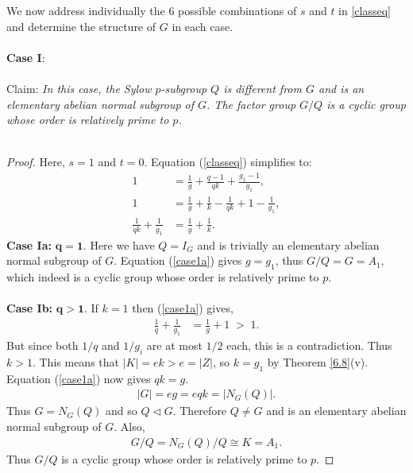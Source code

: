 We now address individually the 6 possible combinations of $s$ and $t$ in \eqref{classeq} and determine the structure of $G$ in each case. \\
\\
\textbf{Case I}:\\
\\
Claim: \textit{In this case, the Sylow $p$-subgroup $Q$ is different from $G$ and is an elementary abelian normal subgroup of $G$. The factor group $G/Q$ is a cyclic group whose order is relatively prime to $p$.} \\
\\
\begin{proof} Here, $s = 1$ and $t = 0$. Equation (\ref{classeq}) simplifies to:
\begin{align}\label{case1a} 1 &= \frac{1}{g} + \frac{q-1}{qk} + \frac{g_1-1}{g_1}, \nonumber
\\ 1 &= \frac{1}{g} + \frac{1}{k} - \frac{1}{qk}  + 1 - \frac{1}{g_1}, \nonumber
\\ \frac{1}{qk}  + \frac{1}{g_1} &= \frac{1}{g} + \frac{1}{k}.
\end{align}
 \space \textbf{Case Ia:} $\pmb{q = 1}$. Here we have $Q = I_G$ and is trivially an elementary abelian normal subgroup of $G$. Equation (\ref{case1a}) gives $g=g_1$, thus $G/Q = G = A_1$, which indeed is a cyclic group whose order is relatively prime to $p$. \\
\\
 \space \textbf{Case Ib:} $\pmb{q > 1}$. If $k=1$ then (\ref{case1a}) gives,
\begin{align*} \frac{1}{q}  + \frac{1}{g_1} &= \frac{1}{g} + 1 \; > \; 1.
\end{align*}
But since both $1/q$ and $1/g_i$ are at most $1/2$ each, this is a contradiction. Thus $k > 1$. This means that $|K| = ek > e = |Z|$, so $k = g_1$ by Theorem \ref{6.8}(v). Equation (\ref{case1a}) now gives $qk = g$.
\begin{align*} |G| = eg = eqk = |N_G(Q)|.
\end{align*}
Thus $G = N_G(Q)$ and so $Q \vartriangleleft G$. Therefore $Q \neq G$ and is an elementary abelian normal subgroup of $G$. Also,
\begin{align*} G/Q = N_G(Q)/Q \cong K = A_1.
\end{align*}
Thus $G/Q$ is a cyclic group whose order is relatively prime to $p$.

\end{proof}

